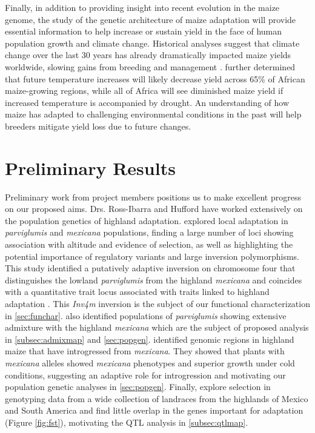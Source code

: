 Finally, in addition to providing insight into recent evolution in the maize genome, the study of the genetic architecture of maize adaptation will provide essential information to help increase or sustain yield in the face of human population growth and climate change. Historical analyses suggest that climate change over the last 30 years has already dramatically impacted maize yields worldwide, slowing gains from breeding and management \citep{Lobell2011}.  \citet{Lobell2011b} further determined that future temperature increases will likely decrease yield across 65\% of African maize-growing regions, while all of Africa will see diminished maize yield if increased temperature is accompanied by drought.  An understanding of how maize has adapted to challenging environmental conditions in the past will help breeders mitigate yield loss due to future changes.

\section*{Preliminary Results}
Preliminary work from project members positions us to make excellent progress on our proposed aims. Drs. Ross-Ibarra and Hufford have worked extensively on the population genetics of highland adaptation.    \citet{Pyhajarvi2013} explored local adaptation in \emph{parviglumis} and \emph{mexicana} populations, finding a large number of loci showing association with altitude and evidence of selection, as well as highlighting the potential importance of regulatory variants and large inversion polymorphisms. This study identified a putatively adaptive inversion on chromosome four that distinguishes the lowland \emph{parviglumis} from the highland \emph{mexicana} and coincides with a quantitative trait locus associated with  traits  linked to highland adaptation \citep{Lauter2004a}. This \emph{Inv4m} inversion is the subject of our functional characterization in \ref{sec:funchar}.  \citet{Pyhajarvi2013} also identified populations of \emph{parviglumis} showing extensive admixture with the highland \emph{mexicana} which are the subject of proposed analysis in \ref{subsec:admixmap} and \ref{sec:popgen}. \citet{Hufford2013} identified genomic regions in highland maize that have introgressed from \emph{mexicana}.  They showed that plants with \emph{mexicana} alleles showed \emph{mexicana} phenotypes and superior growth under cold conditions, suggesting an adaptive role for introgression and motivating our population genetic analyses in \ref{sec:popgen}.  Finally, \cite{takunoparallel} explore selection in genotyping data from a wide collection of landraces from the highlands of Mexico and South America and find little overlap in the genes important for adaptation (Figure \ref{fig:fst}), motivating the QTL analysis in \ref{subsec:qtlmap}.

